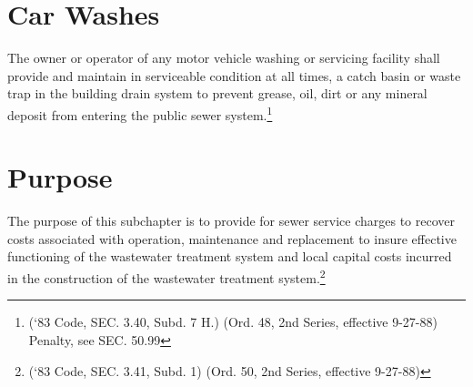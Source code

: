 \section{Car Washes}
The owner or operator of any motor vehicle washing or servicing facility shall provide and maintain in serviceable condition at all times, a catch basin or waste trap in the building drain system to prevent grease, oil, dirt or any mineral deposit from entering the public sewer system.\footnote{(‘83 Code, SEC. 3.40, Subd. 7 H.) (Ord. 48, 2nd Series, effective 9-27-88) Penalty, see SEC. 50.99}



\setcounter{section}{54}
\section{Purpose}
The purpose of this subchapter is to provide for sewer service charges to recover costs associated with operation, maintenance and replacement to insure effective functioning of the wastewater treatment system and local capital costs incurred in the construction of the wastewater treatment system.\footnote{(‘83 Code, SEC. 3.41, Subd. 1) (Ord. 50, 2nd Series, effective 9-27-88)}

